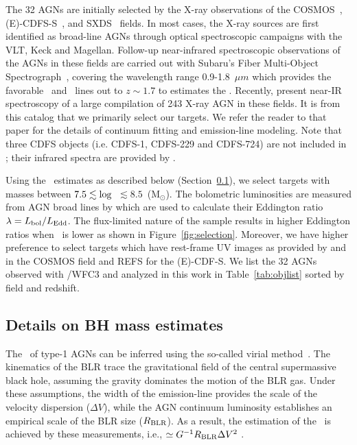 \documentclass[apj]{emulateapj}
\begin{document}
The 32 AGNs are initially selected by the X-ray observations of the COSMOS~\citep{Civano2016}, (E)-CDFS-S~\citep{Lehmer2005, Xue2011}, and SXDS~\citep{Ueda2008} fields. In most cases, the X-ray sources are first identified as broad-line AGNs through optical spectroscopic campaigns with the VLT, Keck and Magellan. Follow-up near-infrared spectroscopic observations of the AGNs in these fields are carried out with Subaru's Fiber Multi-Object Spectrograph~\citep[FMOS, ][]{Kimura2010, Nobuta2012,Matsuoka2013}, covering the wavelength range 0.9-1.8~$\mu m$ which provides the favorable \halpha\ and \hbeta\ lines out to $z\sim1.7$ to estimates the \mbh. Recently, \citet{Schulze2018} present near-IR spectroscopy of a large compilation of 243 X-ray AGN in these fields. It is from this catalog that we primarily select our targets. We refer the reader to that paper for the details of continuum fitting and emission-line modeling. Note that three CDFS objects (i.e. CDFS-1, CDFS-229 and CDFS-724) are not included in \citet{Schulze2018}; their infrared spectra are provided by \citet{Suh2015}.

Using the \mbh\ estimates as described below (Section~\ref{mbh}), we select targets with masses between $7.5 \lesssim {\rm log}$~\mbh$\lesssim8.5$~(M$_{\odot}$). The bolometric luminosities are measured from AGN broad lines by \citet[][Section 3.3]{Schulze2018} which are used to calculate their Eddington ratio $\lambda = L_{\rm bol}/L_{\rm Edd}$. The flux-limited nature of the sample results in higher Eddington ratios when \mbh\ is lower as shown in Figure~\ref{fig:selection}. Moreover, we have higher preference to select targets which have rest-frame UV images as provided by \citet{Scoville2007} and \citet{Koekemoer2007} in the COSMOS field and REFS for the (E)-CDF-S. We list the 32 AGNs observed with \hst/WFC3 and analyzed in this work in Table~\ref{tab:objlist} sorted by field and redshift.




\subsection{Details on BH mass estimates}
\label{mbh}

The \mbh\ of type-1 AGNs can be inferred using the so-called virial method~\citep{Peterson2004, Shen2013}. The kinematics of the BLR trace the gravitational field of the central supermassive black hole, assuming the gravity dominates the motion of the BLR gas. Under these assumptions, the width of the emission-line provides the scale of the velocity dispersion ($\Delta V$), while the AGN continuum luminosity establishes an empirical scale of the BLR size ($R_{\rm BLR}$). As a result, the estimation of the \mbh\ is achieved by these measurements, i.e., \mbh$\simeq G^{-1} R_{\rm BLR} \Delta V^2$ \citep{McLure2004}.
\end{document}
